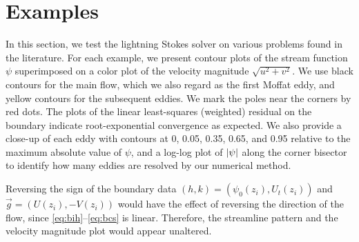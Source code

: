 
\section{Examples \label{sec:results}}
In this section, we test the lightning Stokes solver on various problems found in the literature. For each example, we present contour plots of the stream function $\psi$ superimposed on a color plot of the velocity magnitude $\sqrt{u^2+v^2}$. We use black contours for the main flow, which we also regard as the first Moffat eddy, and yellow contours for the subsequent eddies. We mark the poles near the corners by red dots. The plots of the linear least-squares (weighted) residual on the boundary indicate root-exponential convergence as expected. We also provide a close-up of each eddy with contours at 0, 0.05, 0.35, 0.65, and 0.95 relative to the maximum absolute value of $\psi$, and a log-log plot of $\abs{\psi}$ along the corner bisector to identify how many eddies are resolved by our numerical method.

Reversing the sign of the boundary data $(h,k)=(\psi_0(z_i), U_t(z_i))$ and $\vec{g}=(U(z_i), -V(z_i))$ would have the effect of reversing the direction of the flow, since \eqref{eq:bih}--\eqref{eq:bcs} is linear. Therefore, the streamline pattern and the velocity magnitude plot would appear unaltered.



